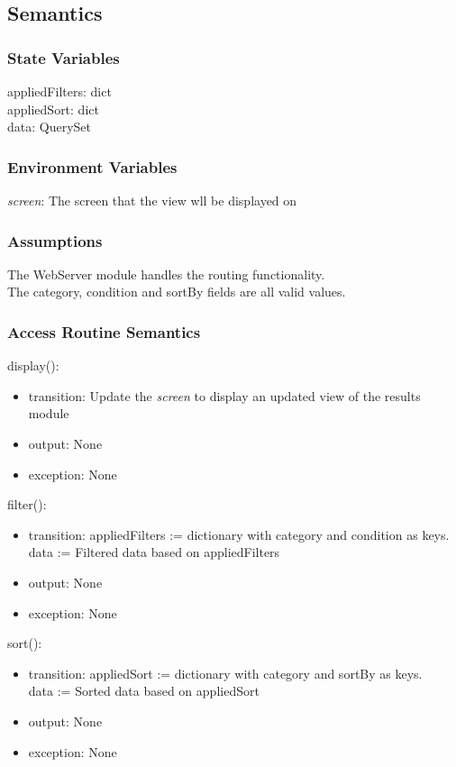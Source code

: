 \documentclass[12pt, titlepage]{article}
\begin{document}
\subsection{Semantics}

\subsubsection{State Variables}

appliedFilters: dict \\
appliedSort: dict \\
data: QuerySet

\subsubsection{Environment Variables}

\textit{screen}: The screen that the view wll be displayed on

\subsubsection{Assumptions}

The WebServer module handles the routing functionality. \\
The category, condition and sortBy fields are all valid values.

\subsubsection{Access Routine Semantics}

\noindent display():
\begin{itemize}
\item transition: Update the \textit{screen} to display an updated view of the results module
\item output: None
\item exception: None
\end{itemize}

\noindent filter():
\begin{itemize}
\item transition: appliedFilters := dictionary with category and condition as keys. \\
data := Filtered data based on appliedFilters
\item output: None
\item exception: None
\end{itemize}

\noindent sort():
\begin{itemize}
\item transition: appliedSort := dictionary with category and sortBy as keys. \\
data := Sorted data based on appliedSort
\item output: None
\item exception: None
\end{itemize}
\end{document}
